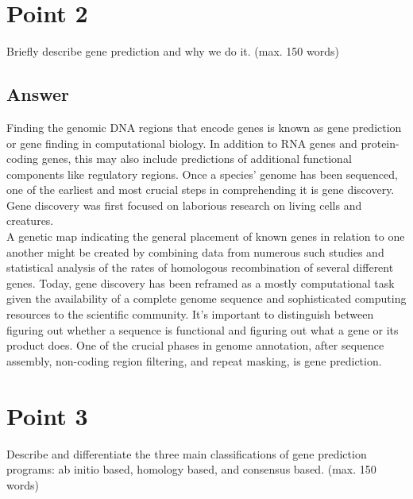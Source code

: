 \documentclass{article}
\begin{document}
\section{Point 2}
Briefly describe gene prediction and why we do it. (max. 150 words)
\subsection*{Answer}
Finding the genomic DNA regions that encode genes is known as gene prediction or gene finding in computational biology. In addition to RNA genes and protein-coding genes, this may also include predictions of additional functional components like regulatory regions. Once a species' genome has been sequenced, one of the earliest and most crucial steps in comprehending it is gene discovery. 
Gene discovery was first focused on laborious research on living cells and creatures.\\
A genetic map indicating the general placement of known genes in relation to one another might be created by combining data from numerous such studies and statistical analysis of the rates of homologous recombination of several different genes. Today, gene discovery has been reframed as a mostly computational task given the availability of a complete genome sequence and sophisticated computing resources to the scientific community. 
It's important to distinguish between figuring out whether a sequence is functional and figuring out what a gene or its product does. 
One of the crucial phases in genome annotation, after sequence assembly, non-coding region filtering, and repeat masking, is gene prediction.
\section{Point 3}
Describe and differentiate the three main classifications of gene prediction
programs: ab initio based, homology based, and consensus based. (max. 150
words)
\end{document}
